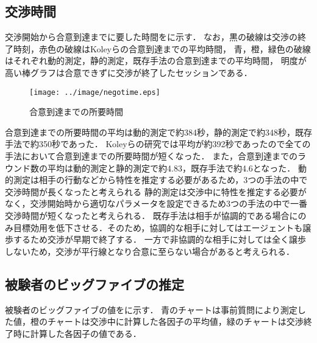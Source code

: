 \subsection{交渉時間}
交渉開始から合意到達までに要した時間をに示す．
なお，黒の破線は交渉の終了時刻，赤色の破線はKoleyらの合意到達までの平均時間，
青，橙，緑色の破線はそれぞれ動的測定，静的測定，既存手法の合意到達までの平均時間，
明度が高い棒グラフは合意できずに交渉が終了したセッションである．

\begin{figure}[bt]
    \centering
    \texttt{[image: ../image/negotime.eps]}
    \caption{合意到達までの所要時間}
    \label{fig:negotime}
\end{figure}

合意到達までの所要時間の平均は動的測定で約384秒，静的測定で約348秒，既存手法で約350秒であった．
Koleyらの研究では平均が約392秒であったので全ての手法において合意到達までの所要時間が短くなった．
また，合意到達までのラウンド数の平均は動的測定と静的測定で約4.83，既存手法で約4.6となった．
動的測定は相手の行動などから特性を推定する必要があるため，3つの手法の中で交渉時間が長くなったと考えられる
静的測定は交渉中に特性を推定する必要がなく，交渉開始時から適切なパラメータを設定できるため3つの手法の中で一番交渉時間が短くなったと考えられる．
既存手法は相手が協調的である場合にのみ目標効用を低下させる．そのため，協調的な相手に対してはエージェントも譲歩するため交渉が早期で終了する．
一方で非協調的な相手に対しては全く譲歩しないため，交渉が平行線となり合意に至らない場合があると考えられる．

\subsection{被験者のビッグファイブの推定}
被験者のビッグファイブの値をに示す．
青のチャートは事前質問により測定した値，橙のチャートは交渉中に計算した各因子の平均値，緑のチャートは交渉終了時に計算した各因子の値である．


